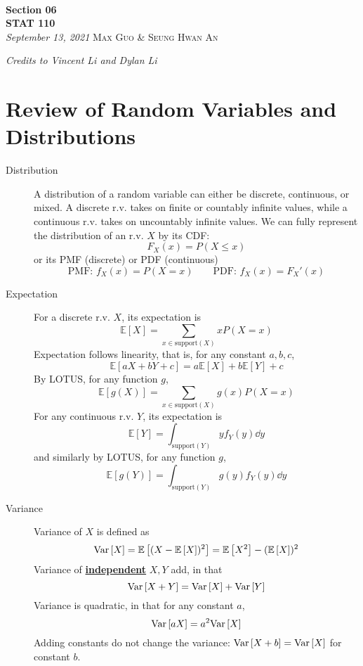 \documentclass[11pt]{article}
\theoremstyle{definition}
\theoremstyle{remark}
\newcommand{\E}[1]{\mathbb{E}\left[ #1 \right]}
\renewcommand{\var}[1]{\textnormal{Var}\left[ #1 \right]}
\newcommand{\inserttitle}{Section 06}
\newcommand{\insertauthor}{Max Guo \& Seung Hwan An}
\newcommand{\insertcourse}{STAT 110}
\begin{document}
{\noindent\Huge\bf  \\[0.1\baselineskip] {\inserttitle }}\\[2\baselineskip]
{{\bf \insertcourse}\\ {\textit{September 13, 2021}}} \hfill {\large \textsc{\insertauthor}}
\smallskip

\hfill \noindent \textit{Credits to Vincent Li and Dylan Li}

\section{Review of Random Variables and Distributions}

\begin{description}

\item[Distribution] A distribution of a random variable can either be discrete, continuous, or mixed. A discrete r.v. takes on finite or countably infinite values, while a continuous r.v. takes on uncountably infinite values. We can fully represent the distribution of an r.v. $X$ by its CDF: $$ F_X(x) = P(X \leq x) $$ or its PMF (discrete) or PDF (continuous) $$ \text{PMF: } f_X(x) = P(X=x) \qquad \text{PDF: } f_X(x) = F_X'(x) $$

\item[Expectation] For a discrete r.v. $X$, its expectation is $$ \E{X} = \sum_{x \in \text{support}(X)} x P(X=x) $$ Expectation follows linearity, that is, for any constant $a,b,c$, $$ \E{aX+bY+c}=a\E{X}+b\E{Y}+c$$ By LOTUS, for any function $g$, $$\E{g(X)} = \sum_{x \in \text{support}(X)} g(x) P(X=x) $$ For any continuous r.v. $Y$, its expectation is $$ \E{Y} = \int_{\text{support}(Y)} y f_Y(y) \dd{y} $$ and similarly by LOTUS, for any function $g$, $$ \E{g(Y)} = \int_{\text{support}(Y)} g(y) f_Y(y) \dd{y} $$ 
    
\item[Variance] Variance of $X$ is defined as $$ \var{X} = \E{(X-\E{X})^2} = \E{X^2} - (\E{X})^2 $$ Variance of \textbf{\underline{independent}} $X,Y$ add, in that $$\var{X+Y} = \var{X}+\var{Y}$$ Variance is quadratic, in that for any constant $a$, $$\var{aX} = a^2 \var{X}$$ Adding constants do not change the variance: $\var{X+b} = \var{X}$ for constant $b$.
\end{description}

\pagebreak
\end{document}
